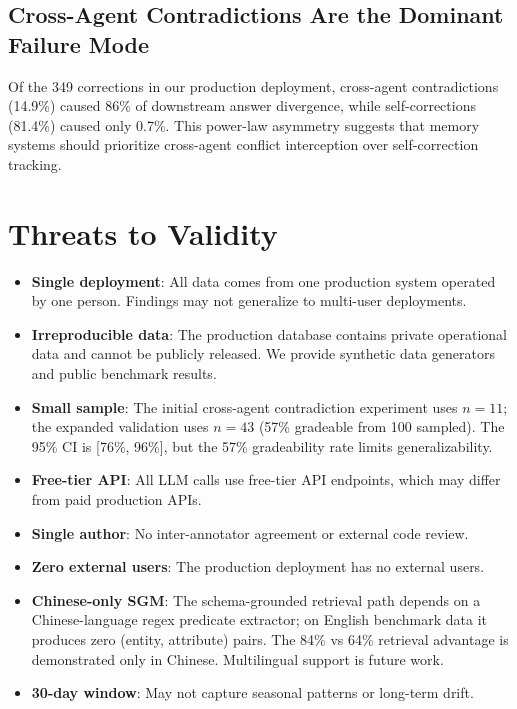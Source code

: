 \documentclass[11pt]{article}
\begin{document}
\subsection{Cross-Agent Contradictions Are the Dominant Failure Mode}

Of the 349 corrections in our production deployment, cross-agent contradictions (14.9\%) caused 86\% of downstream answer divergence, while self-corrections (81.4\%) caused only 0.7\%. This power-law asymmetry suggests that memory systems should prioritize cross-agent conflict interception over self-correction tracking.

\section{Threats to Validity}

\begin{itemize}
\item \textbf{Single deployment}: All data comes from one production system operated by one person. Findings may not generalize to multi-user deployments.
\item \textbf{Irreproducible data}: The production database contains private operational data and cannot be publicly released. We provide synthetic data generators and public benchmark results.
\item \textbf{Small sample}: The initial cross-agent contradiction experiment uses $n=11$; the expanded validation uses $n=43$ (57\% gradeable from 100 sampled). The 95\% CI is [76\%, 96\%], but the 57\% gradeability rate limits generalizability.
\item \textbf{Free-tier API}: All LLM calls use free-tier API endpoints, which may differ from paid production APIs.
\item \textbf{Single author}: No inter-annotator agreement or external code review.
\item \textbf{Zero external users}: The production deployment has no external users.
\item \textbf{Chinese-only SGM}: The schema-grounded retrieval path depends on a Chinese-language regex predicate extractor; on English benchmark data it produces zero (entity, attribute) pairs. The 84\% vs 64\% retrieval advantage is demonstrated only in Chinese. Multilingual support is future work.
\item \textbf{30-day window}: May not capture seasonal patterns or long-term drift.
\end{itemize}
\end{document}
